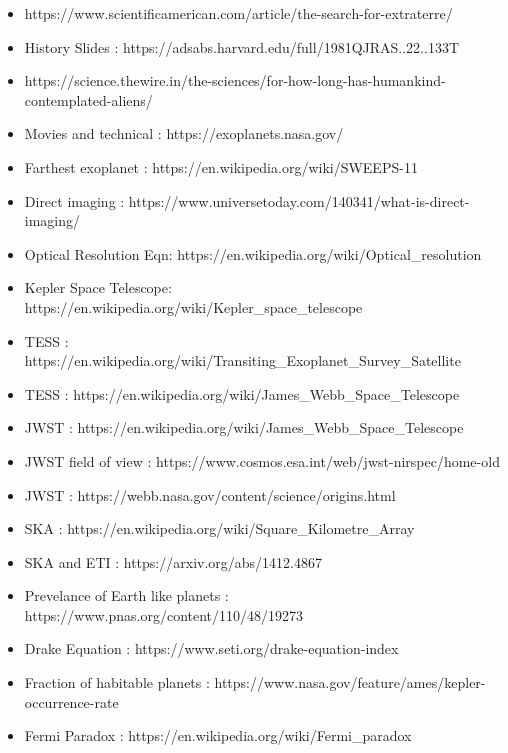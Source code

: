 \documentclass{beamer}
\begin{document}
\begin{frame}
\begin{itemize}
    \item \scriptsize{https://www.scientificamerican.com/article/the-search-for-extraterre/}
    \item History Slides : \scriptsize{https://adsabs.harvard.edu/full/1981QJRAS..22..133T}
    \item \scriptsize{https://science.thewire.in/the-sciences/for-how-long-has-humankind-contemplated-aliens/}
    \item Movies and technical : \scriptsize{https://exoplanets.nasa.gov/}
    \item Farthest exoplanet : \scriptsize{https://en.wikipedia.org/wiki/SWEEPS-11}
    \item Direct imaging : \scriptsize{https://www.universetoday.com/140341/what-is-direct-imaging/}
    \item Optical Resolution Eqn: \scriptsize{https://en.wikipedia.org/wiki/Optical\_resolution}
    \item Kepler Space Telescope: \scriptsize{https://en.wikipedia.org/wiki/Kepler\_space\_telescope}
    \item TESS : \scriptsize{https://en.wikipedia.org/wiki/Transiting\_Exoplanet\_Survey\_Satellite}
    \item TESS : \scriptsize{https://en.wikipedia.org/wiki/James\_Webb\_Space\_Telescope}
    \item JWST : \scriptsize{https://en.wikipedia.org/wiki/James\_Webb\_Space\_Telescope}
    \item JWST field of view : \scriptsize{https://www.cosmos.esa.int/web/jwst-nirspec/home-old}
    \item JWST : \scriptsize{https://webb.nasa.gov/content/science/origins.html}
    \item SKA : \scriptsize{https://en.wikipedia.org/wiki/Square\_Kilometre\_Array}
    \item SKA and ETI : \scriptsize{https://arxiv.org/abs/1412.4867}
    \item Prevelance of Earth like planets : \scriptsize{https://www.pnas.org/content/110/48/19273}
    \item Drake Equation : \scriptsize{https://www.seti.org/drake-equation-index}
    \item Fraction of habitable planets : \scriptsize{https://www.nasa.gov/feature/ames/kepler-occurrence-rate}
    \item Fermi Paradox : \scriptsize{https://en.wikipedia.org/wiki/Fermi\_paradox}
\end{itemize}
\end{frame}
\end{document}

